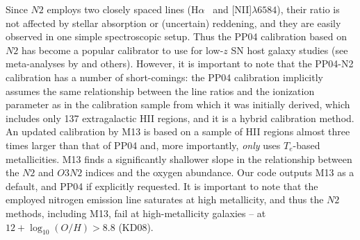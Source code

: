 \documentclass{emulateapj} \usepackage{amsmath} \usepackage{float}
\newcommand{\oxabinline}{\ensuremath{12 + \log_{10}(O/H)}}
\newcommand{\ha}{\ensuremath{\mathrm{H}\alpha}}
\newcommand{\hb}{\ensuremath{\mathrm{H}\beta}}
\begin{document}



Since $N2$ employs two closely spaced lines (\ha~ and
[NII]$\lambda6584$), their ratio is not affected by stellar absorption
or (uncertain) reddening, and they are easily observed in one simple
spectroscopic setup. Thus the PP04 calibration based on $N2$ has
become a popular calibrator to use for low-$z$ SN host galaxy studies
(see meta-analyses by \citealt{sanders12,modjaz12_proc,leloudas14} and
others). However, it is important to note that the PP04-N2 calibration
has a number of short-comings: the PP04 calibration implicitly assumes
the same relationship between the line ratios and the ionization
parameter as in the calibration sample from which it was initially
derived, which includes only 137 extragalactic HII regions, and it is
a hybrid calibration method. An updated calibration by M13 is based on
a sample of HII regions almost three times larger than that of PP04
and, more importantly, \emph{only} uses $T_e$-based metallicities. M13
finds a significantly shallower slope in the relationship between the
$N2$ and $O3N2$ indices and the oxygen abundance. Our code outputs M13
as a default, and PP04 if explicitly requested.  It is important to
note that the employed nitrogen emission line saturates at high
metallicity, and thus the $N2$ methods, including M13, fail at
high-metallicity galaxies -- at $\oxabinline > 8.8$ (KD08).
\end{document}
